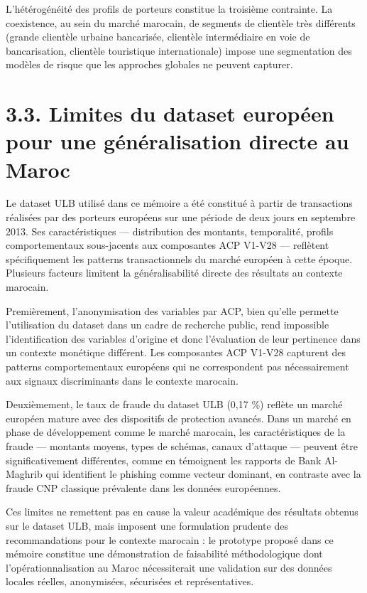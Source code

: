 L'hétérogénéité des profils de porteurs constitue la troisième contrainte. La coexistence, au sein du marché marocain, de segments de clientèle très différents (grande clientèle urbaine bancarisée, clientèle intermédiaire en voie de bancarisation, clientèle touristique internationale) impose une segmentation des modèles de risque que les approches globales ne peuvent capturer.

\section{3.3. Limites du dataset européen pour une généralisation directe au Maroc}

Le dataset ULB utilisé dans ce mémoire a été constitué à partir de transactions réalisées par des porteurs européens sur une période de deux jours en septembre 2013. Ses caractéristiques — distribution des montants, temporalité, profils comportementaux sous-jacents aux composantes ACP V1-V28 — reflètent spécifiquement les patterns transactionnels du marché européen à cette époque. Plusieurs facteurs limitent la généralisabilité directe des résultats au contexte marocain.

Premièrement, l'anonymisation des variables par ACP, bien qu'elle permette l'utilisation du dataset dans un cadre de recherche public, rend impossible l'identification des variables d'origine et donc l'évaluation de leur pertinence dans un contexte monétique différent. Les composantes ACP V1-V28 capturent des patterns comportementaux européens qui ne correspondent pas nécessairement aux signaux discriminants dans le contexte marocain.

Deuxièmement, le taux de fraude du dataset ULB (0,17 \%) reflète un marché européen mature avec des dispositifs de protection avancés. Dans un marché en phase de développement comme le marché marocain, les caractéristiques de la fraude — montants moyens, types de schémas, canaux d'attaque — peuvent être significativement différentes, comme en témoignent les rapports de Bank Al-Maghrib qui identifient le phishing comme vecteur dominant, en contraste avec la fraude CNP classique prévalente dans les données européennes.

Ces limites ne remettent pas en cause la valeur académique des résultats obtenus sur le dataset ULB, mais imposent une formulation prudente des recommandations pour le contexte marocain : le prototype proposé dans ce mémoire constitue une démonstration de faisabilité méthodologique dont l'opérationnalisation au Maroc nécessiterait une validation sur des données locales réelles, anonymisées, sécurisées et représentatives.

